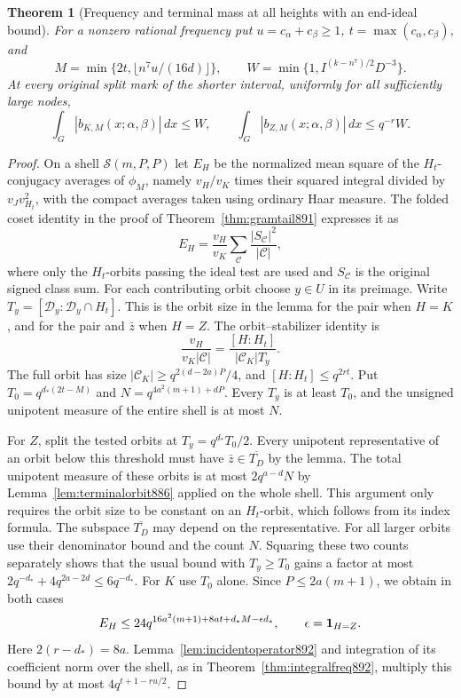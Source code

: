 \documentclass[a4paper,11pt]{article}
\newtheorem{theorem}[proposition]{Theorem}
\theoremstyle{definition}
\theoremstyle{remark}
\numberwithin{equation}{section}
\begin{document}
\begin{theorem}[Frequency and terminal mass at all heights with an end-ideal bound]
\leavevmode\label{thm:endtransform894}
For a nonzero rational frequency put \(u=c_\alpha+c_\beta\ge1\),
\(t=\max(c_\alpha,c_\beta)\), and
\[
 M=\min\{2t,\lfloor n^7u/(16d)\rfloor\},\qquad
 W=\min\{1,I^{(k-n^7)/2}D^{-3}\}.
\]
At every original split mark of the shorter interval, uniformly
for all sufficiently large nodes,
\[
       \int_G |b_{K,M}(x;\alpha,\beta)|\,dx\le W,\qquad
       \int_G |b_{Z,M}(x;\alpha,\beta)|\,dx\le q^{-r}W .
\]
\end{theorem}
\begin{proof}
On a shell \(\mathcal S(m,P,P)\) let \(E_H\) be the normalized
mean square of the \(H_t\)-conjugacy averages of \(\phi_M\),
namely \(v_H/v_K\) times their squared integral divided by
\(v_Jv_{H_t}^2\), with the compact averages taken using ordinary
Haar measure. The folded coset identity in the proof of
Theorem~\ref{thm:gramtail891} expresses it as
\[
 E_H=\frac{v_H}{v_K}\sum_{\mathcal C}
        \frac{|S_{\mathcal C}|^2}{|\mathcal C|},
\]
where only the \(H_t\)-orbits passing the ideal test are used and
\(S_{\mathcal C}\) is the original signed class sum. For each
contributing orbit choose \(y\in U\) in its preimage. Write
\(T_y=[\mathcal D_y:\mathcal D_y\cap H_t]\). This is the orbit
size in the lemma for the pair when \(H=K\), and for the pair and
\(\bar z\) when \(H=Z\). The orbit--stabilizer identity is
\[
        \frac{v_H}{v_K|\mathcal C|}
            =\frac{[H:H_t]}{|\mathcal C_K|T_y}.
\]
The full orbit has size \(|\mathcal C_K|\ge
q^{2(d-2a)P}/4\), and \([H:H_t]\le q^{2rt}\). Put
\(T_0=q^{d_*(2t-M)}\) and \(N=q^{4a^2(m+1)+dP}\).
Every \(T_y\) is at least \(T_0\), and the unsigned unipotent
measure of the entire shell is at most \(N\).

For \(Z\), split the tested orbits at \(T_y=q^{d_*}T_0/2\).
Every unipotent representative of an orbit below this threshold
must have \(\bar z\in\overline{T_D}\) by the lemma. The total
unipotent measure of these orbits is at most \(2q^{a-d}N\)
by Lemma~\ref{lem:terminalorbit886} applied on the whole shell.
This argument only requires the orbit size to be constant on an
\(H_t\)-orbit, which follows from its index formula. The subspace
\(\overline{T_D}\) may depend on the representative.
For all larger orbits use their denominator bound and the count
\(N\). Squaring these two counts separately shows that the
usual bound with \(T_y\ge T_0\) gains a factor at most
\(2q^{-d_*}+4q^{2a-2d}\le6q^{-d_*}\). For \(K\) use \(T_0\)
alone. Since \(P\le2a(m+1)\), we obtain in both cases
\[
      E_H\le24q^{16a^2(m+1)+8at+d_*M-\epsilon d_*},
      \qquad \epsilon={\bf1}_{H=Z}.
\]
Here \(2(r-d_*)=8a\). Lemma~\ref{lem:incidentoperator892} and
integration of its coefficient norm over the shell, as in
Theorem~\ref{thm:integralfreq892}, multiply this bound by at
most \(4q^{t+1-ru/2}\).


\end{proof}
\end{document}

